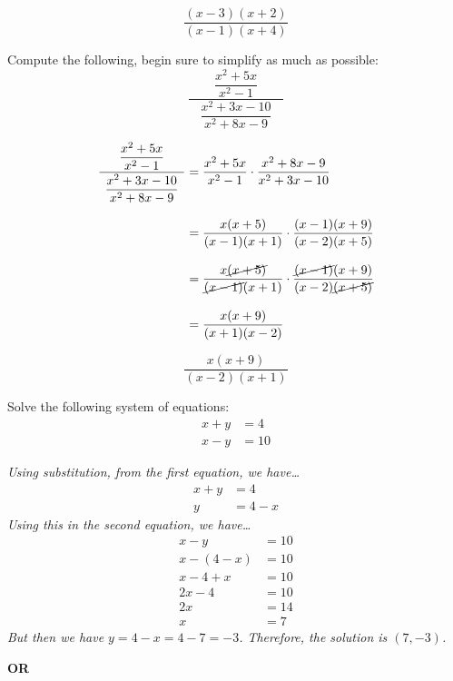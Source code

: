 \documentclass[12pt,letterpaper]{exam}
\begin{document}
\begin{questions}
	\[
	\boxed{\dfrac{(x - 3)(x + 2)}{(x - 1)(x + 4)}}
	\]





\newpage
\question[5] Compute the following, begin sure to simplify as much as possible:
	\[
	\dfrac{\phantom{--}\dfrac{x^2 + 5x}{x^2 - 1}\phantom{--}}{\dfrac{x^2 + 3x - 10}{x^2 + 8x - 9}}
	\] \pspace

	\[
	\begin{aligned}
	\dfrac{\phantom{--}\dfrac{x^2 + 5x}{x^2 - 1}\phantom{--}}{\dfrac{x^2 + 3x - 10}{x^2 + 8x - 9}}&= \dfrac{x^2 + 5x}{x^2 - 1} \cdot \dfrac{x^2 + 8x - 9}{x^2 + 3x - 10} \\[0.3cm]
	&= \dfrac{x(x + 5)}{(x - 1)(x + 1)} \cdot \dfrac{(x - 1)(x + 9)}{(x - 2)(x + 5)} \\[0.3cm]
	&= \dfrac{x\cancel{(x + 5)}}{\cancel{(x - 1)}(x + 1)} \cdot \dfrac{\cancel{(x - 1)}(x + 9)}{(x - 2)\cancel{(x + 5)}} \\[0.3cm]
	&= \dfrac{x(x + 9)}{(x + 1)(x - 2)}
	\end{aligned}
	\] \pspace
	
	\[
	\boxed{\dfrac{x(x + 9)}{(x - 2)(x + 1)}}
	\]





\newpage
\question[5] Solve the following system of equations:
	\[
	\begin{aligned}
	x + y&= 4 \\
	x - y&= 10
	\end{aligned}
	\] \pspace

{\itshape Using substitution, from the first equation, we have\dots
	\[
	\begin{aligned}
	x + y&= 4 \\
	y&= 4 - x
	\end{aligned}
	\]
Using this in the second equation, we have\dots
	\[
	\begin{aligned}
	x - y&= 10 \\
	x - (4 - x)&= 10 \\
	x - 4 + x&= 10 \\
	2x - 4&= 10 \\
	2x&= 14 \\
	x&= 7
	\end{aligned}
	\]
But then we have $y= 4 - x= 4 - 7= -3$. Therefore, the solution is $(7, -3)$. 

	\begin{center} {\bfseries OR} \end{center}

}
\end{questions}
\end{document}
